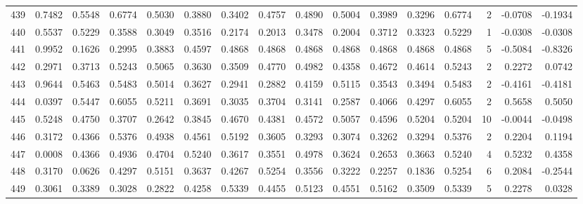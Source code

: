 \begin{tabular}{lrrrrrrrrrrrrrrr}
439 &      0.7482 &  0.5548 &  0.6774 &  0.5030 &  0.3880 &  0.3402 &  0.4757 &  0.4890 &  0.5004 &  0.3989 &   0.3296 &     0.6774 &      2 &                   -0.0708 &                    -0.1934 \\
440 &      0.5537 &  0.5229 &  0.3588 &  0.3049 &  0.3516 &  0.2174 &  0.2013 &  0.3478 &  0.2004 &  0.3712 &   0.3323 &     0.5229 &      1 &                   -0.0308 &                    -0.0308 \\
441 &      0.9952 &  0.1626 &  0.2995 &  0.3883 &  0.4597 &  0.4868 &  0.4868 &  0.4868 &  0.4868 &  0.4868 &   0.4868 &     0.4868 &      5 &                   -0.5084 &                    -0.8326 \\
442 &      0.2971 &  0.3713 &  0.5243 &  0.5065 &  0.3630 &  0.3509 &  0.4770 &  0.4982 &  0.4358 &  0.4672 &   0.4614 &     0.5243 &      2 &                    0.2272 &                     0.0742 \\
443 &      0.9644 &  0.5463 &  0.5483 &  0.5014 &  0.3627 &  0.2941 &  0.2882 &  0.4159 &  0.5115 &  0.3543 &   0.3494 &     0.5483 &      2 &                   -0.4161 &                    -0.4181 \\
444 &      0.0397 &  0.5447 &  0.6055 &  0.5211 &  0.3691 &  0.3035 &  0.3704 &  0.3141 &  0.2587 &  0.4066 &   0.4297 &     0.6055 &      2 &                    0.5658 &                     0.5050 \\
445 &      0.5248 &  0.4750 &  0.3707 &  0.2642 &  0.3845 &  0.4670 &  0.4381 &  0.4572 &  0.5057 &  0.4596 &   0.5204 &     0.5204 &     10 &                   -0.0044 &                    -0.0498 \\
446 &      0.3172 &  0.4366 &  0.5376 &  0.4938 &  0.4561 &  0.5192 &  0.3605 &  0.3293 &  0.3074 &  0.3262 &   0.3294 &     0.5376 &      2 &                    0.2204 &                     0.1194 \\
447 &      0.0008 &  0.4366 &  0.4936 &  0.4704 &  0.5240 &  0.3617 &  0.3551 &  0.4978 &  0.3624 &  0.2653 &   0.3663 &     0.5240 &      4 &                    0.5232 &                     0.4358 \\
448 &      0.3170 &  0.0626 &  0.4297 &  0.5151 &  0.3637 &  0.4267 &  0.5254 &  0.3556 &  0.3222 &  0.2257 &   0.1836 &     0.5254 &      6 &                    0.2084 &                    -0.2544 \\
449 &      0.3061 &  0.3389 &  0.3028 &  0.2822 &  0.4258 &  0.5339 &  0.4455 &  0.5123 &  0.4551 &  0.5162 &   0.3509 &     0.5339 &      5 &                    0.2278 &                     0.0328 \\

\end{tabular}
